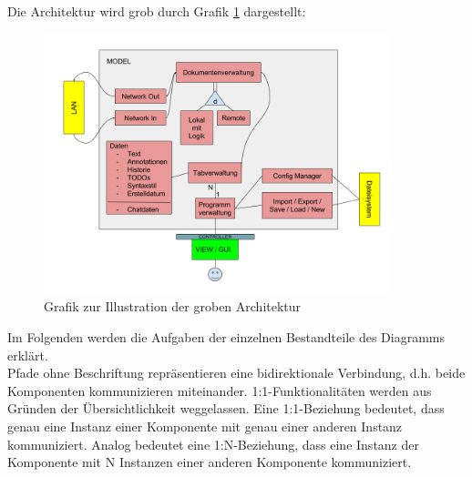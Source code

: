 \documentclass{scrartcl}
\begin{document}
Die Architektur wird grob durch Grafik \ref{fig:architektur} dargestellt:

\begin{figure}[h]
	\centering
    \includegraphics[width=0.9\textwidth]{img/architektur}
    \caption{Grafik zur Illustration der groben Architektur}
	\label{fig:architektur}
\end{figure}

Im Folgenden werden die Aufgaben der einzelnen Bestandteile des Diagramms erklärt. \\ Pfade ohne Beschriftung repräsentieren eine bidirektionale Verbindung, d.h. beide Komponenten kommunizieren miteinander. 1:1-Funktionalitäten werden aus Gründen der Übersichtlichkeit weggelassen. Eine 1:1-Beziehung bedeutet, dass genau eine Instanz einer Komponente mit genau einer anderen Instanz kommuniziert.
Analog bedeutet eine 1:N-Beziehung, dass eine Instanz der Komponente mit N Instanzen einer anderen Komponente kommuniziert.
\\
\end{document}
